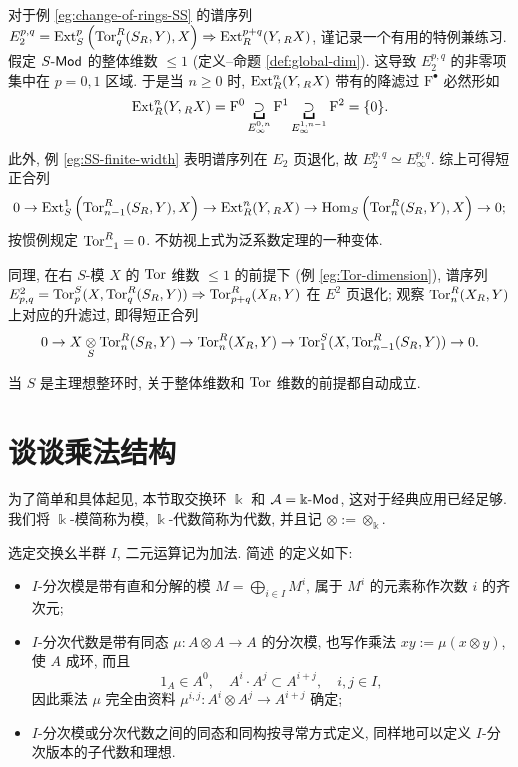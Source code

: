 \begin{example}\label{eg:change-of-rings-SS-bis}
	对于例 \ref{eg:change-of-rings-SS} 的谱序列 $E_2^{p,q} = \operatorname{Ext}_S^p\left( \operatorname{Tor}^R_q(S_R, Y), X \right) \Rightarrow \operatorname{Ext}_R^{p+q}(Y, {}_R X)$, 谨记录一个有用的特例兼练习. 假定 $S\text{-}\mathsf{Mod}$ 的整体维数 $\leq 1$ (定义--命题 \ref{def:global-dim}). 这导致 $E_2^{p, q}$ 的非零项集中在 $p=0,1$ 区域. 于是当 $n \geq 0$ 时, $\operatorname{Ext}_R^n(Y, {}_R X)$ 带有的降滤过 $\mathrm{F}^\bullet$ 必然形如
	\[ \Ext_R^n(Y, {}_R X) = \mathrm{F}^0 \underbracket{\supset}_{E_\infty^{0, n}} \mathrm{F}^1 \underbracket{\supset}_{E_\infty^{1, n-1}} \mathrm{F}^2 = \{0\}. \]
	
	此外, 例 \ref{eg:SS-finite-width} 表明谱序列在 $E_2$ 页退化, 故 $E_2^{p, q} \simeq E_\infty^{p, q}$. 综上可得短正合列
	\[ 0 \to \operatorname{Ext}_S^1\left( \operatorname{Tor}^R_{n-1}(S_R, Y), X \right) \to \operatorname{Ext}_R^n(Y, {}_R X) \to \operatorname{Hom}_S\left( \operatorname{Tor}^R_n(S_R, Y), X \right) \to 0; \]
	按惯例规定 $\operatorname{Tor}^R_{-1} = 0$. 不妨视上式为泛系数定理的一种变体.
	
	同理, 在右 $S$-模 $X$ 的 $\operatorname{Tor}$ 维数 $\leq 1$ 的前提下 (例 \ref{eg:Tor-dimension}), 谱序列 $E^2_{p, q} = \operatorname{Tor}^S_p(X, \operatorname{Tor}^R_q(S_R, Y)) \Rightarrow \operatorname{Tor}^R_{p+q}(X_R, Y)$ 在 $E^2$ 页退化; 观察 $\operatorname{Tor}^R_n(X_R, Y)$ 上对应的升滤过, 即得短正合列
	\[ 0 \to X \underset{S}{\otimes} \operatorname{Tor}^R_n(S_R, Y) \to \operatorname{Tor}^R_n(X_R, Y) \to \operatorname{Tor}^S_1(X, \operatorname{Tor}^R_{n-1}(S_R, Y)) \to 0. \]
	
	当 $S$ 是主理想整环时, 关于整体维数和 $\operatorname{Tor}$ 维数的前提都自动成立.
\end{example}

\section{谈谈乘法结构}\label{sec:multiplicative-SS}
为了简单和具体起见, 本节取交换环 $\Bbbk$ 和 $\mathcal{A} = \Bbbk\text{-}\mathsf{Mod}$, 这对于经典应用已经足够. 我们将 $\Bbbk$-模简称为模, $\Bbbk$-代数简称为代数, 并且记 $\otimes := \otimes_{\Bbbk}$.

选定交换幺半群 $I$, 二元运算记为加法. 简述 \cite[\S 7.4]{Li1} 的定义如下:
\begin{itemize}
	\item $I$-分次模是带有直和分解的模 $M = \bigoplus_{i \in I} M^i$, 属于 $M^i$ 的元素称作次数 $i$ 的齐次元;
	\item $I$-分次代数是带有同态 $\mu: A \otimes A \to A$ 的分次模, 也写作乘法 $xy := \mu(x \otimes y)$, 使 $A$ 成环, 而且
	\[ 1_A \in A^0, \quad A^i \cdot A^j \subset A^{i+j}, \quad i, j \in I, \]
	因此乘法 $\mu$ 完全由资料 $\mu^{i,j}: A^i \otimes A^j \to A^{i+j}$ 确定;
	\item $I$-分次模或分次代数之间的同态和同构按寻常方式定义, 同样地可以定义 $I$-分次版本的子代数和理想. 
\end{itemize}

